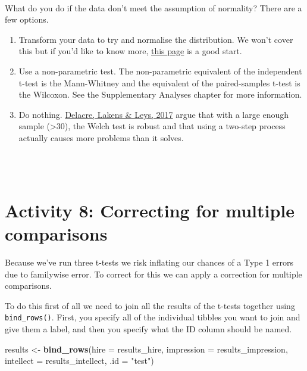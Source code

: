 \documentclass[]{book}
\newenvironment{Shaded}{\begin{snugshade}}{\end{snugshade}}
\newcommand{\DataTypeTok}[1]{\textcolor[rgb]{0.13,0.29,0.53}{#1}}
\newcommand{\KeywordTok}[1]{\textcolor[rgb]{0.13,0.29,0.53}{\textbf{#1}}}
\newcommand{\NormalTok}[1]{#1}
\newcommand{\StringTok}[1]{\textcolor[rgb]{0.31,0.60,0.02}{#1}}
\providecommand{\tightlist}{%
  \setlength{\itemsep}{0pt}\setlength{\parskip}{0pt}}
\newenvironment{warning}
    {
    \hline\\
    }
    { 
    \\\\\hline
    }
\begin{document}
\begin{warning}
What do you do if the data don't meet the assumption of normality? There
are a few options.

\begin{enumerate}
\def\labelenumi{\arabic{enumi}.}
\tightlist
\item
  Transform your data to try and normalise the distribution. We won't
  cover this but if you'd like to know more,
  \href{https://www.researchgate.net/profile/Jason_Osborne2/publication/200152356_Notes_on_the_Use_of_Data_Transformations/links/0deec5295f1eb10df8000000.pdf}{this
  page} is a good start.
\item
  Use a non-parametric test. The non-parametric equivalent of the
  independent t-test is the Mann-Whitney and the equivalent of the
  paired-samples t-test is the Wilcoxon. See the Supplementary Analyses
  chapter for more information.
\item
  Do nothing.
  \href{https://www.rips-irsp.com/articles/10.5334/irsp.82/}{Delacre,
  Lakens \& Leys, 2017} argue that with a large enough sample
  (\textgreater{}30), the Welch test is robust and that using a two-step
  process actually causes more problems than it solves.
\end{enumerate}
\end{warning}

\hypertarget{activity-8-correcting-for-multiple-comparisons}{%
\section{Activity 8: Correcting for multiple comparisons}\label{activity-8-correcting-for-multiple-comparisons}}

Because we've run three t-tests we risk inflating our chances of a Type 1 errors due to familywise error. To correct for this we can apply a correction for multiple comparisons.

To do this first of all we need to join all the results of the t-tests
together using \texttt{bind\_rows()}. First, you specify all of the individual tibbles you want to join and give them a label, and then you specify what the ID column should be named.

\begin{Shaded}
\begin{Highlighting}[]
\NormalTok{results <-}\StringTok{ }\KeywordTok{bind_rows}\NormalTok{(}\DataTypeTok{hire =}\NormalTok{ results_hire, }\DataTypeTok{impression =}\NormalTok{ results_impression, }\DataTypeTok{intellect =}\NormalTok{ results_intellect, }\DataTypeTok{.id =} \StringTok{"test"}\NormalTok{)}
\end{Highlighting}
\end{Shaded}
\end{document}
